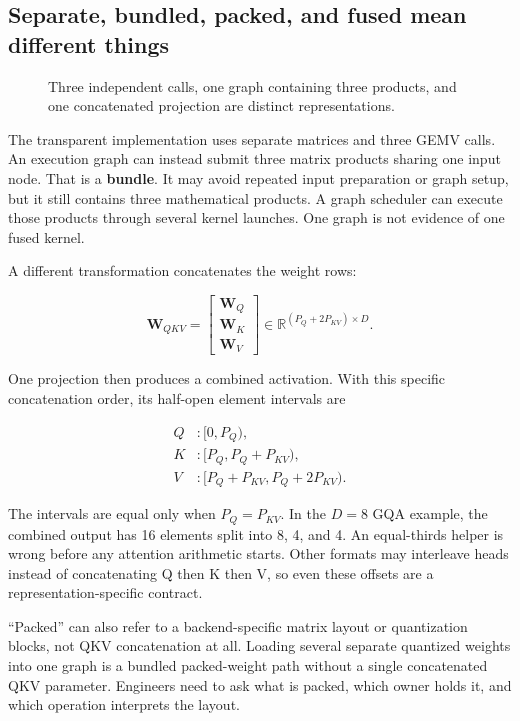 \documentclass[
  10pt,
]{article}
\begin{document}
\subsection{Separate, bundled, packed, and fused mean different
things}\label{separate-bundled-packed-and-fused-mean-different-things}

\begin{figure}[H]\centering\resizebox{\linewidth}{!}{}\caption{Three independent calls, one graph containing three products, and one concatenated projection are distinct representations.}\end{figure}

The transparent implementation uses separate matrices and three GEMV
calls. An execution graph can instead submit three matrix products
sharing one input node. That is a \textbf{bundle}. It may avoid repeated
input preparation or graph setup, but it still contains three
mathematical products. A graph scheduler can execute those products
through several kernel launches. One graph is not evidence of one fused
kernel.

A different transformation concatenates the weight rows:

\[
\mathbf{W}_{QKV}=
\begin{bmatrix}\mathbf{W}_Q\\\mathbf{W}_K\\\mathbf{W}_V\end{bmatrix}
\in\mathbb{R}^{(P_Q+2P_{KV})\times D}.
\]

One projection then produces a combined activation. With this specific
concatenation order, its half-open element intervals are

\[
\begin{aligned}
Q&:[0,P_Q),\\
K&:[P_Q,P_Q+P_{KV}),\\
V&:[P_Q+P_{KV},P_Q+2P_{KV}).
\end{aligned}
\]

The intervals are equal only when \(P_Q=P_{KV}\). In the \(D=8\) GQA
example, the combined output has 16 elements split into 8, 4, and 4. An
equal-thirds helper is wrong before any attention arithmetic starts.
Other formats may interleave heads instead of concatenating Q then K
then V, so even these offsets are a representation-specific contract.

``Packed'' can also refer to a backend-specific matrix layout or
quantization blocks, not QKV concatenation at all. Loading several
separate quantized weights into one graph is a bundled packed-weight
path without a single concatenated QKV parameter. Engineers need to ask
what is packed, which owner holds it, and which operation interprets the
layout.
\end{document}
